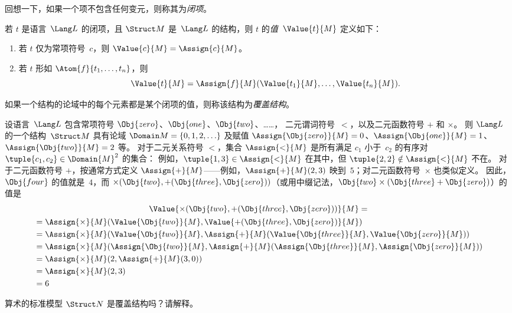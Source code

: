 \documentclass[../../../include/open-logic-section]{subfiles}
\begin{document}


\begin{explain}
回想一下，如果一个项不包含任何变元，则称其为\emph{闭项}。
\end{explain}

\begin{defn}[闭项的值]
若 $t$ 是语言~$\Lang L$ 的闭项，且 $\Struct M$ 是~$\Lang L$ 的结构，则 $t$ 的\emph{值}~$\Value{t}{M}$ 定义如下：
\begin{enumerate}
\item 若 $t$ 仅为常项符号~$c$，则 $\Value{c}{M} = \Assign{c}{M}$。
\item 若 $t$ 形如 $\Atom{f}{t_1, \ldots, t_n}$，则
  \[
  \Value{t}{M} = \Assign{f}{M}(\Value{t_1}{M}, \ldots,
  \Value{t_n}{M}).
  \]
\end{enumerate}
\end{defn}

\begin{defn}[覆盖结构]
如果一个结构的论域中的每个元素都是某个闭项的值，则称该结构为\emph{覆盖结构}。
\end{defn}

\begin{ex}
设语言~$\Lang L$ 包含常项符号 $\Obj{zero}$、$\Obj{one}$、$\Obj{two}$、……，
二元谓词符号~$<$，以及二元函数符号 $+$ 和 $\times$。
则 $\Lang L$ 的一个结构~$\Struct M$ 具有论域 $\Domain M = \{0, 1, 2, \ldots
\}$
及赋值 $\Assign{\Obj{zero}}{M} = 0$、$\Assign{\Obj{one}}{M} = 1$、$\Assign{\Obj{two}}{M} = 2$ 等。
对于二元关系符号 $<$，集合 $\Assign{<}{M}$ 是所有满足 $c_1$ 小于~$c_2$ 的有序对 $\tuple{c_1, c_2} \in \Domain{M}^2$ 的集合：
例如，$\tuple{1, 3} \in
\Assign{<}{M}$ 在其中，但 $\tuple{2, 2} \notin \Assign{<}{M}$ 不在。
对于二元函数符号 $+$，按通常方式定义 $\Assign{+}{M}$——例如，$\Assign{+}{M}(2,3)$ 映到~$5$；对二元函数符号~$\times$ 也类似定义。
因此，$\Obj{four}$ 的值就是~$4$，而 $\times(\Obj{two},
+(\Obj{three},\Obj{zero}))$（或用中缀记法，$\Obj{two} \times
(\Obj{three} + \Obj{zero})$）的值是 \begin{multline*}
\Value{\times(\Obj{two}, +(\Obj{three},\Obj{zero}))}{M} =\\
\begin{aligned}
& =\Assign{\times}{M}(\Value{\Obj{two}}{M}, \Value{+(\Obj{three}, \Obj{zero})}{M})\\
& = \Assign{\times}{M}(\Value{\Obj{two}}{M}, \Assign{+}{M}(\Value{\Obj{three}}{M},
\Value{\Obj{zero}}{M})) \\
& = \Assign{\times}{M}(\Assign{\Obj{two}}{M}, \Assign{+}{M}(\Assign{\Obj{three}}{M},
\Assign{\Obj{zero}}{M})) \\
& = \Assign{\times}{M}(2, \Assign{+}{M}(3, 0)) \\
& = \Assign{\times}{M}(2, 3) \\
& = 6
\end{aligned}
\end{multline*}
\end{ex}

\begin{prob}
算术的标准模型 $\Struct N$ 是覆盖结构吗？请解释。
\end{prob}
\end{document}
